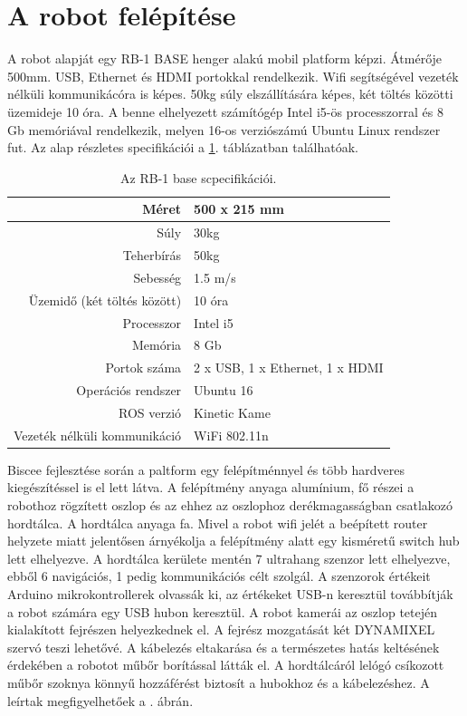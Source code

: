\section{A robot felépítése}
A robot alapját egy RB-1 BASE henger alakú mobil platform képzi. Átmérője 500mm. USB, Ethernet és HDMI portokkal rendelkezik. Wifi segítségével vezeték nélküli kommunikácóra is képes. 50kg súly elszállítására képes, két töltés közötti üzemideje 10 óra. A benne elhelyezett számítógép Intel i5-ös processzorral és 8 Gb memóriával rendelkezik, melyen 16-os verziószámú Ubuntu Linux rendszer fut. Az alap részletes specifikációi a
\ref{tab:rb1_base_specifications}. táblázatban találhatóak.

\begin{table}[!ht]
    \footnotesize
    \centering
    \renewcommand{\arraystretch}{1.5}
    \begin{tabular} {|r | l |}
        \hline
        Méret & 500 x 215 mm \\
        \hline
        Súly & 30kg \\
        \hline
        Teherbírás & 50kg \\
        \hline
        Sebesség & 1.5 m/s \\
        \hline
        Üzemidő (két töltés között) & 10 óra \\
        \hline
        \hline
        Processzor & Intel i5 \\
        \hline
        Memória & 8 Gb \\
        \hline
        Portok száma & 2 x USB, 1 x Ethernet, 1 x HDMI \\
        \hline
        \hline
        Operációs rendszer & Ubuntu 16 \\
        \hline
        ROS verzió & Kinetic Kame \\
        \hline
        Vezeték nélküli kommunikáció & WiFi 802.11n \\
        \hline
    \end{tabular}
    \caption{Az RB-1 base scpecifikációi.}
    \label{tab:rb1_base_specifications}
\end{table}

Biscee fejlesztése során a paltform egy felépítménnyel és több hardveres kiegészítéssel is el lett látva. A felépítmény anyaga alumínium, fő részei a robothoz rögzített oszlop és az ehhez az oszlophoz derékmagasságban csatlakozó hordtálca. A hordtálca anyaga fa. Mivel a robot wifi jelét a beépített router helyzete miatt jelentősen árnyékolja a felépítmény alatt egy kisméretű switch hub lett elhelyezve. A hordtálca kerülete mentén 7 ultrahang szenzor lett elhelyezve, ebből 6 navigációs, 1 pedig kommunikációs célt szolgál. A szenzorok értékeit Arduino mikrokontrollerek olvassák ki, az értékeket USB-n keresztül továbbítják a robot számára egy USB hubon keresztül. A robot kamerái az oszlop tetején kialakított fejrészen helyezkednek el. A fejrész mozgatását két DYNAMIXEL szervó teszi lehetővé. A kábelezés eltakarása és a természetes hatás keltésének érdekében a robotot műbőr borítással látták el. A hordtálcáról lelógó csíkozott műbőr szoknya könnyű hozzáférést biztosít a hubokhoz és a kábelezéshez. A leírtak megfigyelhetőek a
. ábrán.

